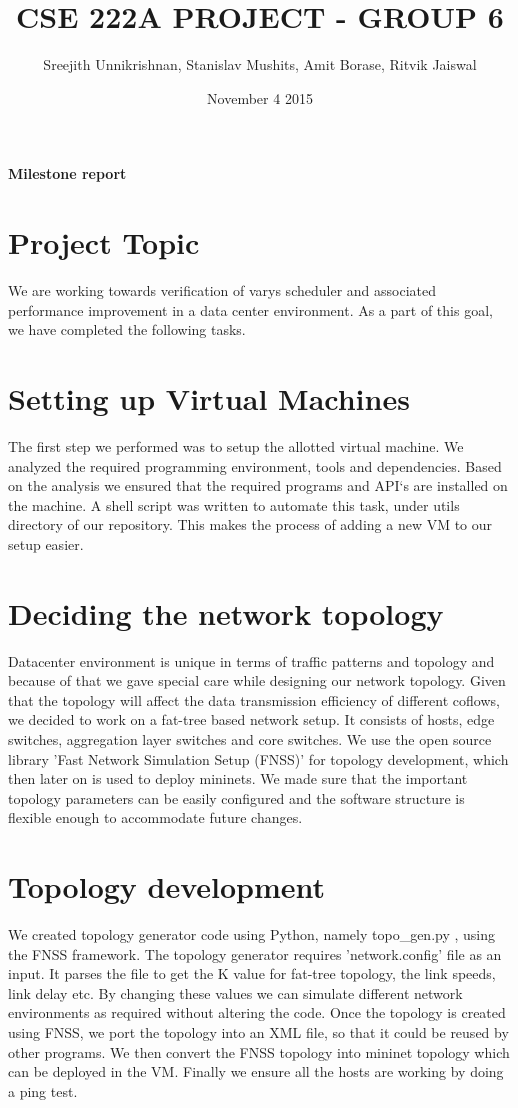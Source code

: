 \documentclass{article}
\title{CSE 222A PROJECT - GROUP 6}
\author{Sreejith Unnikrishnan, Stanislav Mushits, Amit Borase, Ritvik Jaiswal }
\date{November 4 2015}
\begin{document}
\maketitle

\begin{center}
\textbf{Milestone report}
\end{center}


\section{Project Topic}
We are working towards verification of varys scheduler\cite{varys} and associated performance improvement in a data center environment. As a part of this goal, we have completed the following tasks.

\section{Setting up Virtual Machines}
The first step we performed was to setup the allotted virtual machine. We analyzed the required programming environment, tools and dependencies. Based on the analysis we ensured that the required programs and API`s are installed on the machine. A shell script was written to automate this task, under utils directory of our repository. This makes the process of adding a new VM to our setup easier.

\section{Deciding the network topology}
Datacenter environment is unique in terms of traffic patterns and topology and because of that we gave special care while designing our network topology. Given that the topology will affect the data transmission efficiency of different coflows, we decided to work on a fat-tree based network setup. It consists of hosts, edge switches, aggregation layer switches and core switches. We use the open source library 'Fast Network Simulation Setup (FNSS)' \cite{fnss} for topology development, which then later on is used to deploy mininets. We made sure that the important topology parameters can be easily configured and the software structure is flexible enough to accommodate future changes.

\section{Topology development}
We created topology generator code using Python, namely topo\_gen.py \cite{repo}, using the FNSS framework. The topology generator requires 'network.config' file as an input. It parses the file to get the K value for fat-tree topology, the link speeds, link delay etc. By changing these values we can simulate different network environments as required without altering the code. Once the topology is created using FNSS, we port the topology into an XML file, so that it could be reused by other programs. We then convert the FNSS topology into mininet topology which can be deployed in the VM. Finally we ensure all the hosts are working by doing a ping test.
\end{document}

